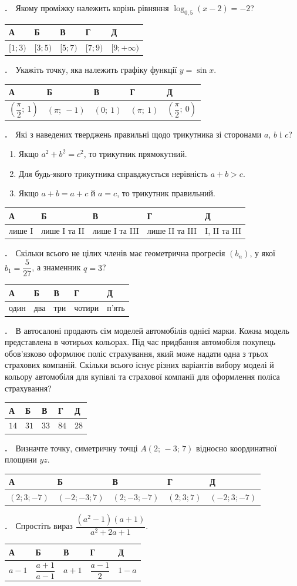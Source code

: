 \documentclass[12pt]{article}
\newcommand{\answerTable}[5]{%
\par\vspace{0.15cm}
\noindent
\begin{tabular}{|*{5}{>{\centering\arraybackslash}m{3cm}|}}
\hline
\rule[-0.15cm]{0pt}{0.6cm}\textbf{А} & \rule[-0.15cm]{0pt}{0.6cm}\textbf{Б} & \rule[-0.15cm]{0pt}{0.6cm}\textbf{В} & \rule[-0.15cm]{0pt}{0.6cm}\textbf{Г} & \rule[-0.15cm]{0pt}{0.6cm}\textbf{Д} \\
\hline
\rule[-0.2cm]{0pt}{0.75cm}#1 & \rule[-0.2cm]{0pt}{0.75cm}#2 & \rule[-0.2cm]{0pt}{0.75cm}#3 & \rule[-0.2cm]{0pt}{0.75cm}#4 & \rule[-0.2cm]{0pt}{0.75cm}#5 \\
\hline
\end{tabular}
\par\vspace{0.25cm}
}
\newcommand{\answerTableTall}[5]{%
\par\vspace{0.15cm}
\noindent
\begin{tabular}{|*{5}{>{\centering\arraybackslash}m{3cm}|}}
\hline
\rule[-0.2cm]{0pt}{0.7cm}\textbf{А} & \rule[-0.2cm]{0pt}{0.7cm}\textbf{Б} & \rule[-0.2cm]{0pt}{0.7cm}\textbf{В} & \rule[-0.2cm]{0pt}{0.7cm}\textbf{Г} & \rule[-0.2cm]{0pt}{0.7cm}\textbf{Д} \\
\hline
\rule[-0.45cm]{0pt}{1.2cm}#1 & \rule[-0.45cm]{0pt}{1.2cm}#2 & \rule[-0.45cm]{0pt}{1.2cm}#3 & \rule[-0.45cm]{0pt}{1.2cm}#4 & \rule[-0.45cm]{0pt}{1.2cm}#5 \\
\hline
\end{tabular}
\par\vspace{0.25cm}
}
\newcounter{zad}
\newcommand{\zadtask}[1]{\stepcounter{zad}\par\vspace{0.3cm}\noindent\textbf{\thezad.}\ \ #1\par\vspace{0.2cm}}
\begin{document}
\zadtask{Якому проміжку належить корінь рівняння $\log_{0{,}5}(x - 2) = -2$?}
\answerTable{$[1; 3)$}{$[3; 5)$}{$[5; 7)$}{$[7; 9)$}{$[9; +\infty)$}
\zadtask{Укажіть точку, яка належить графіку функції $y = \sin x$.}
\answerTableTall{$\left(\dfrac{\pi}{2};\ 1\right)$}{$(\pi;\ -1)$}{$(0;\ 1)$}{$(\pi;\ 1)$}{$\left(\dfrac{\pi}{2};\ 0\right)$}
\zadtask{Які з наведених тверджень правильні щодо трикутника зі сторонами $a$, $b$ і $c$?
\vspace{0.1cm}
\begin{enumerate}[label=\textbf{\Roman*.}, leftmargin=2.8em, itemsep=0.1cm]
\item Якщо $a^2 + b^2 = c^2$, то трикутник прямокутний.
\item Для будь-якого трикутника справджується нерівність $a + b > c$.
\item Якщо $a + b = a + c$ й $a = c$, то трикутник правильний.
\end{enumerate}
\vspace{0.1cm}}
\answerTable{лише I}{лише I та II}{лише I та III}{лише II та III}{I, II та III}
\zadtask{Скільки всього не цілих членів має геометрична прогресія $(b_n)$, у якої $b_1 = \dfrac{5}{27}$, а знаменник $q = 3$?}
\answerTable{один}{два}{три}{чотири}{п'ять}
\zadtask{В автосалоні продають сім моделей автомобілів однієї марки. Кожна модель представлена в чотирьох кольорах. Під час придбання автомобіля покупець обов'язково оформлює поліс страхування, який може надати одна з трьох страхових компаній. Скільки всього існує різних варіантів вибору моделі й кольору автомобіля для купівлі та страхової компанії для оформлення поліса страхування?}
\answerTable{$14$}{$31$}{$33$}{$84$}{$28$}
\zadtask{Визначте точку, симетричну точці $A(2;\, -3;\, 7)$ відносно координатної площини $yz$.}
\answerTable{$(2; 3; -7)$}{$(-2; -3; 7)$}{$(2; -3; -7)$}{$(2; 3; 7)$}{$(-2; 3; -7)$}
\zadtask{Спростіть вираз $\dfrac{(a^2 - 1)(a + 1)}{a^2 + 2a + 1}$.}
\answerTableTall{$a - 1$}{$\dfrac{a+1}{a-1}$}{$a + 1$}{$\dfrac{a-1}{2}$}{$1 - a$}
\end{document}
